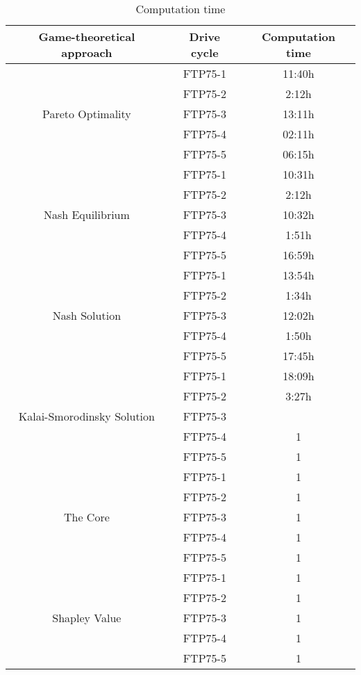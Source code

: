 \begin{table}[h]
\centering
\begin{tabular}{ |c|c|c| } 
 \hline
 Game-theoretical approach & Drive cycle & Computation time \\
 \hline\hline
 \multirow{5}{*}{Pareto Optimality} & FTP75-1 & 11:40h \\ 
 & FTP75-2 & 2:12h \\ 
 & FTP75-3 & 13:11h \\ 
 & FTP75-4 & 02:11h \\ 
 & FTP75-5 & 06:15h\\ 
 \hline 
 \multirow{5}{*}{Nash Equilibrium} & FTP75-1 & 10:31h \\ 
 & FTP75-2 & 2:12h\\ 
 & FTP75-3 & 10:32h\\ 
 & FTP75-4 & 1:51h\\ 
 & FTP75-5 & 16:59h\\ 
 \hline 
 \multirow{5}{*}{Nash Solution} & FTP75-1 & 13:54h \\ 
 & FTP75-2 & 1:34h\\ 
 & FTP75-3 & 12:02h\\ 
 & FTP75-4 & 1:50h\\ 
 & FTP75-5 & 17:45h\\  
 \hline
  \multirow{5}{*}{Kalai-Smorodinsky Solution} & FTP75-1 & 18:09h \\ 
 & FTP75-2 & 3:27h\\ 
 & FTP75-3 & \\ 
 & FTP75-4 & 1\\ 
 & FTP75-5 & 1\\  
 \hline
 \multirow{5}{*}{The Core} & FTP75-1 & 1 \\ 
 & FTP75-2 & 1\\ 
 & FTP75-3 & 1\\ 
 & FTP75-4 & 1\\ 
 & FTP75-5 & 1\\ 
 \hline 
  \multirow{5}{*}{Shapley Value} & FTP75-1 & 1 \\ 
 & FTP75-2 & 1\\ 
 & FTP75-3 & 1\\ 
 & FTP75-4 & 1\\ 
 & FTP75-5 & 1\\  
 \hline
\end{tabular}
\caption{Computation time}
\label{tab:config}
\end{table}


